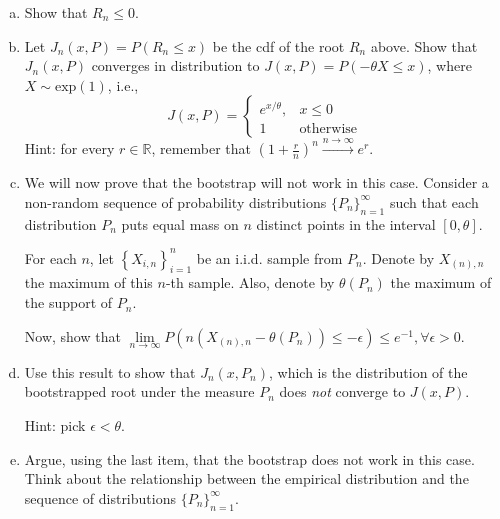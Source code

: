 \documentclass[11pt]{article}
\theoremstyle{definition}
\begin{document}
\begin{enumerate}[a)]
	\item Show that $R_n \leq 0$.
    \item Let $J_n(x, P) = P(R_n \leq x)$ be the cdf of the root $R_n$ above. Show that $J_n(x, P)$ converges in distribution to $J(x, P) = P(-\theta X \leq x)$, where $X \sim \text{exp}(1)$, i.e.,
    \[
    J(x, P) =
    \begin{cases}
    e^{x/\theta}, & x \leq 0 \\
    1 & \text{otherwise}
    \end{cases}
    \]
	Hint: for every $r \in \mathbb{R}$, remember that $\left(1 + \frac{r}{n}\right)^{n} \xrightarrow{n \to \infty} e^r$.

	\item We will now prove that the bootstrap will not work in this case. Consider a non-random sequence of probability distributions $\{P_n\}_{n=1}^{\infty}$ such that each distribution $P_n$ puts equal mass on $n$ distinct points in the interval $[0, \theta]$.
	
	For each $n$, let $\left\{X_{i, n}\right\}_{i=1}^{n}$ be an i.i.d. sample from $P_n$. Denote by $X_{(n), n}$ the maximum of this $n$-th sample. Also, denote by $\theta(P_n)$ the maximum of the support of $P_n$.
	
	Now, show that $\lim\limits_{n\rightarrow \infty}P\left(n (X_{(n), n} - \theta(P_n)) \leq - \epsilon\right) \leq e^{-1}, \forall \epsilon >0$.

	\item Use this result to show that $J_n(x, P_n)$, which is the distribution of the bootstrapped root under the measure $P_n$ does \textit{not} converge to $J(x, P)$.
	
	Hint: pick $\epsilon < \theta$.

	\item Argue, using the last item, that the bootstrap does not work in this case. Think about the relationship between the empirical distribution and the sequence of distributions $\{P_n\}_{n=1}^{\infty}$.
\end{enumerate}
\end{document}
